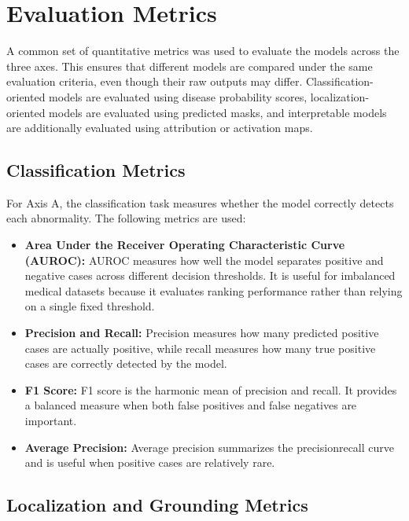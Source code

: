 \section{Evaluation Metrics}

A common set of quantitative metrics was used to evaluate the models across the three axes. This ensures that different models are compared under the same evaluation criteria, even though their raw outputs may differ. Classification-oriented models are evaluated using disease probability scores, localization-oriented models are evaluated using predicted masks, and interpretable models are additionally evaluated using attribution or activation maps.

\subsection{Classification Metrics}

For Axis A, the classification task measures whether the model correctly detects each abnormality. The following metrics are used:

\begin{itemize}
    \item \textbf{Area Under the Receiver Operating Characteristic Curve (AUROC):} AUROC measures how well the model separates positive and negative cases across different decision thresholds. It is useful for imbalanced medical datasets because it evaluates ranking performance rather than relying on a single fixed threshold.
    
    \item \textbf{Precision and Recall:} Precision measures how many predicted positive cases are actually positive, while recall measures how many true positive cases are correctly detected by the model.
    
    \item \textbf{F1 Score:} F1 score is the harmonic mean of precision and recall. It provides a balanced measure when both false positives and false negatives are important.
    
    \item \textbf{Average Precision:} Average precision summarizes the precisionrecall curve and is useful when positive cases are relatively rare.
    
\end{itemize}

\subsection{Localization and Grounding Metrics}

